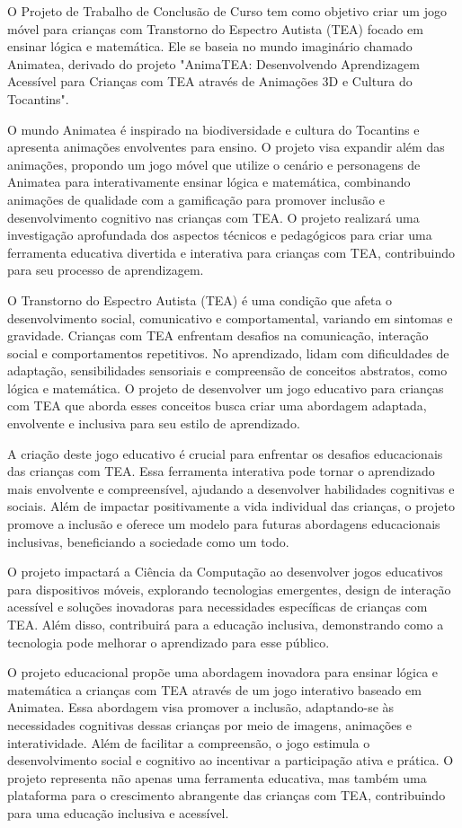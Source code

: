 \documentclass[tcc1,project]{classe_uftex/uftex}
\begin{document}
O Projeto de Trabalho de Conclusão de Curso tem como objetivo criar um jogo móvel para crianças com Transtorno do Espectro Autista (TEA) focado em ensinar lógica e matemática. Ele se baseia no mundo imaginário chamado Animatea, derivado do projeto "AnimaTEA: Desenvolvendo Aprendizagem Acessível para Crianças com TEA através de Animações 3D e Cultura do Tocantins". 

O mundo Animatea é inspirado na biodiversidade e cultura do Tocantins e apresenta animações envolventes para ensino. O projeto visa expandir além das animações, propondo um jogo móvel que utilize o cenário e personagens de Animatea para interativamente ensinar lógica e matemática, combinando animações de qualidade com a gamificação para promover inclusão e desenvolvimento cognitivo nas crianças com TEA. O projeto realizará uma investigação aprofundada dos aspectos técnicos e pedagógicos para criar uma ferramenta educativa divertida e interativa para crianças com TEA, contribuindo para seu processo de aprendizagem.

O Transtorno do Espectro Autista (TEA) é uma condição que afeta o desenvolvimento social, comunicativo e comportamental, variando em sintomas e gravidade. Crianças com TEA enfrentam desafios na comunicação, interação social e comportamentos repetitivos. No aprendizado, lidam com dificuldades de adaptação, sensibilidades sensoriais e compreensão de conceitos abstratos, como lógica e matemática. O projeto de desenvolver um jogo educativo para crianças com TEA que aborda esses conceitos busca criar uma abordagem adaptada, envolvente e inclusiva para seu estilo de aprendizado.

A criação deste jogo educativo é crucial para enfrentar os desafios educacionais das crianças com TEA. Essa ferramenta interativa pode tornar o aprendizado mais envolvente e compreensível, ajudando a desenvolver habilidades cognitivas e sociais. Além de impactar positivamente a vida individual das crianças, o projeto promove a inclusão e oferece um modelo para futuras abordagens educacionais inclusivas, beneficiando a sociedade como um todo.

O projeto impactará a Ciência da Computação ao desenvolver jogos educativos para dispositivos móveis, explorando tecnologias emergentes, design de interação acessível e soluções inovadoras para necessidades específicas de crianças com TEA. Além disso, contribuirá para a educação inclusiva, demonstrando como a tecnologia pode melhorar o aprendizado para esse público.

O projeto educacional propõe uma abordagem inovadora para ensinar lógica e matemática a crianças com TEA através de um jogo interativo baseado em Animatea. Essa abordagem visa promover a inclusão, adaptando-se às necessidades cognitivas dessas crianças por meio de imagens, animações e interatividade. Além de facilitar a compreensão, o jogo estimula o desenvolvimento social e cognitivo ao incentivar a participação ativa e prática. O projeto representa não apenas uma ferramenta educativa, mas também uma plataforma para o crescimento abrangente das crianças com TEA, contribuindo para uma educação inclusiva e acessível.\\
\end{document}
